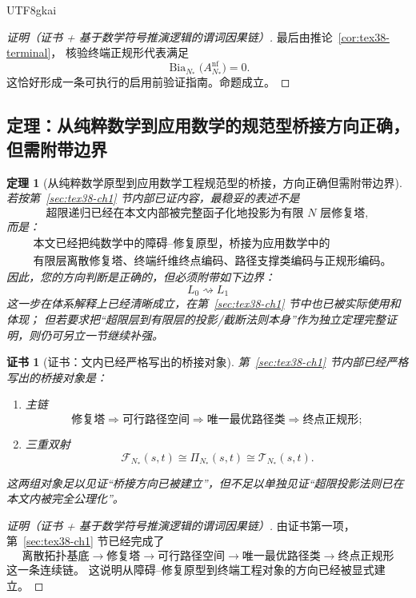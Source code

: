 \documentclass[12pt]{article}
\newtheorem{theorem}{定理}[section]
\newtheorem{Certificate}{证书}[section]
\newcommand{\Bia}{\operatorname{Bia}}
\begin{document}
\begin{CJK*}{UTF8}{gkai}
\begin{proof}[证明（证书 + 基于数学符号推演逻辑的谓词因果链）]
最后由推论~\ref{cor:tex38-terminal}，
核验终端正规形代表满足
\[
  \Bia_{N_\ast}\bigl(A_{N_\ast}^{\mathrm{nf}}\bigr)=0.
\]
这恰好形成一条可执行的启用前验证指南。命题成立。
\end{proof}

\subsection{定理：从纯粹数学到应用数学的规范型桥接方向正确，但需附带边界}
\label{subsec:tex38-bridge-theorem}

\begin{theorem}[从纯粹数学原型到应用数学工程规范型的桥接，方向正确但需附带边界]
\label{thm:tex38-bridge-direction}
若按第~\ref{sec:tex38-ch1} 节内部已证内容，最稳妥的表述不是
\[
  \text{超限递归已经在本文内部被完整函子化地投影为有限 $N$ 层修复塔},
\]
而是：
\[
  \begin{aligned}
    &\text{本文已经把纯数学中的障碍--修复原型，桥接为应用数学中的}\\
    &\text{有限层离散修复塔、终端纤维终点编码、路径支撑类编码与正规形编码。}
  \end{aligned}
\]
因此，您的方向判断是正确的，但必须附带如下边界：
\[
  L_0\rightsquigarrow L_1
\]
这一步在体系解释上已经清晰成立，在第~\ref{sec:tex38-ch1} 节中也已被实际使用和体现；
但若要求把“超限层到有限层的投影/截断法则本身”作为独立定理完整证明，则仍可另立一节继续补强。
\end{theorem}

\begin{Certificate}[证书：文内已经严格写出的桥接对象]
\label{cert:tex38-bridge-direction}
第~\ref{sec:tex38-ch1} 节内部已经严格写出的桥接对象是：
\begin{enumerate}
  \item 主链
  \[
    \text{修复塔}
    \Longrightarrow
    \text{可行路径空间}
    \Longrightarrow
    \text{唯一最优路径类}
    \Longrightarrow
    \text{终点正规形};
  \]
  \item 三重双射
  \[
    \mathcal{F}_{N_\ast}(s,t)
    \cong
    \Pi_{N_\ast}(s,t)
    \cong
    \mathcal{T}_{N_\ast}(s,t).
  \]
\end{enumerate}
这两组对象足以见证“桥接方向已被建立”，但不足以单独见证“超限投影法则已在本文内被完全公理化”。
\end{Certificate}

\begin{proof}[证明（证书 + 基于数学符号推演逻辑的谓词因果链）]
由证书第一项，第~\ref{sec:tex38-ch1} 节已经完成了
\[
  \text{离散拓扑基底}
  \to
  \text{修复塔}
  \to
  \text{可行路径空间}
  \to
  \text{唯一最优路径类}
  \to
  \text{终点正规形}
\]
这一条连续链。
这说明从障碍--修复原型到终端工程对象的方向已经被显式建立。


\end{proof}
\end{CJK*}
\end{document}
